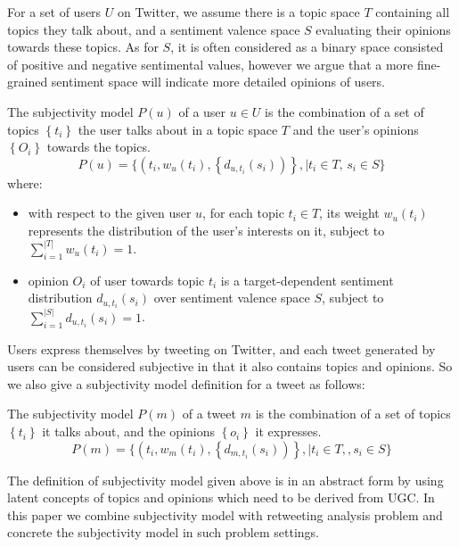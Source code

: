\documentclass[twocolumn]{svjour3}          %
\begin{document}
For a set of users $U$ on Twitter, we assume there is a topic space $T$ containing all topics they talk about, and a sentiment valence space $S$ evaluating their opinions towards these topics. As for $S$, it is often considered as a binary space consisted of positive and negative sentimental values, however we argue that a more fine-grained sentiment space will indicate more detailed opinions of users. 
\begin{definition}
The subjectivity model  $ P \left( u \right) $ of a user $u \in U $ is the combination of a set of topics $\left\lbrace  t_{i}  \right\rbrace $ the user talks about in a topic space $T$ and the user's opinions $\left\lbrace O_{i} \right\rbrace$ towards the topics. 
\begin{equation}
\label{usermodel}
P \left( u \right) = \lbrace \left( t_{i}, w_{u} \left( t_{i} \right), \left\lbrace d_{u,t_{i}} \left( s_{i} \right) \right) \right\rbrace,\vert  t_{i} \in T, \, s_{i} \in S \rbrace
\end{equation}
where:
\begin{itemize}
\item with respect to the given user $u$,  for each topic $t_{i} \in T$, its  weight $ w_{u} \left( t_{i} \right)$ represents the distribution of the user's interests on it, subject to $ \sum_{i=1}^{|T|}w_{u} \left( t_{i} \right)=1 $.
\item opinion $O_{i}$ of user towards topic $t_{i}$ is a target-dependent sentiment distribution  $d_{u,t_{i}} \left( s_{i} \right)$ over sentiment valence space $S$, subject to $ \sum_{i=1}^{|S|}d_{u,t_{i}} \left( s_{i} \right)=1$.
\end{itemize}
\end{definition}
Users express themselves by tweeting on Twitter, and each tweet generated by users can be considered subjective in that it also contains topics and opinions. So we also give a subjectivity model definition for a tweet as follows:
\begin{definition}  
The subjectivity model  $ P \left( m \right)  $ of a tweet $m$ is the combination of a set of topics $\left\lbrace t_{i}  \right\rbrace$ it talks about, and the opinions $\left\lbrace o_{i} \right\rbrace$ it expresses.
\begin{equation}
\label{tweetmodel}
P \left( m \right) = \lbrace \left( t_{i}, w_{m} \left( t_{i} \right), \left\lbrace d_{m,t_{i}} \left( s_{i} \right) \right) \right\rbrace,\vert  t_{i} \in T, , s_{i} \in S \rbrace
\end{equation}
\end{definition}
The definition of subjectivity model given above is in an abstract form by using latent concepts of topics and opinions which need to be derived from UGC. In this paper we combine subjectivity model with retweeting analysis problem and concrete the subjectivity model in such problem settings.  
\end{document}
